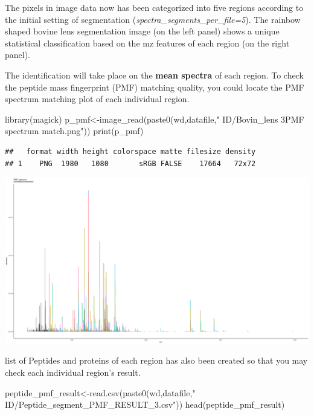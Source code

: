 \documentclass[
]{article}
\newenvironment{Shaded}{\begin{snugshade}}{\end{snugshade}}
\newcommand{\FunctionTok}[1]{\textcolor[rgb]{0.00,0.00,0.00}{#1}}
\newcommand{\NormalTok}[1]{#1}
\newcommand{\OtherTok}[1]{\textcolor[rgb]{0.56,0.35,0.01}{#1}}
\newcommand{\StringTok}[1]{\textcolor[rgb]{0.31,0.60,0.02}{#1}}
\begin{document}
The pixels in image data now has been categorized into five regions
according to the initial setting of segmentation
(\emph{spectra\_segments\_per\_file=5}). The rainbow shaped bovine lens
segmentation image (on the left panel) shows a unique statistical
classification based on the mz features of each region (on the right
panel).

The identification will take place on the \textbf{mean spectra} of each
region. To check the peptide mass fingerprint (PMF) matching quality,
you could locate the PMF spectrum matching plot of each individual
region.

\begin{Shaded}
\begin{Highlighting}[]
\FunctionTok{library}\NormalTok{(magick)}
\NormalTok{p\_pmf}\OtherTok{\textless{}{-}}\FunctionTok{image\_read}\NormalTok{(}\FunctionTok{paste0}\NormalTok{(wd,datafile,}\StringTok{" ID/Bovin\_lens 3PMF spectrum match.png"}\NormalTok{))}
\FunctionTok{print}\NormalTok{(p\_pmf)}
\end{Highlighting}
\end{Shaded}

\begin{verbatim}
##   format width height colorspace matte filesize density
## 1    PNG  1980   1080       sRGB FALSE    17664   72x72
\end{verbatim}

\includegraphics[width=27.5in]{README_files/figure-latex/unnamed-chunk-6-1}

list of Peptides and proteins of each region has also been created so
that you may check each individual region's result.

\begin{Shaded}
\begin{Highlighting}[]
\NormalTok{peptide\_pmf\_result}\OtherTok{\textless{}{-}}\FunctionTok{read.csv}\NormalTok{(}\FunctionTok{paste0}\NormalTok{(wd,datafile,}\StringTok{" ID/Peptide\_segment\_PMF\_RESULT\_3.csv"}\NormalTok{))}
\FunctionTok{head}\NormalTok{(peptide\_pmf\_result)}
\end{Highlighting}
\end{Shaded}
\end{document}

